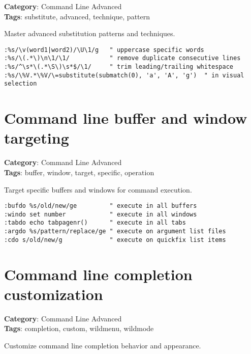 {{{\textbf{Category}: Command Line Advanced\\ \textbf{Tags}: substitute, advanced, technique, pattern
\vspace{0.5cm}

Master advanced substitution patterns and techniques.

\begin{Exa*}{}
\begin{Verbatim}[fontsize=\footnotesize, breaklines, breakanywhere]
:%s/\v(word1|word2)/\U\1/g   " uppercase specific words
:%s/\(.*\)\n\1/\1/           " remove duplicate consecutive lines
:%s/^\s*\(.*\S\)\s*$/\1/     " trim leading/trailing whitespace
:%s/\%V.*\%V/\=substitute(submatch(0), 'a', 'A', 'g')  " in visual selection
\end{Verbatim}
\end{Exa*}

\section{Command line buffer and window targeting}

\textbf{Category}: Command Line Advanced\\ \textbf{Tags}: buffer, window, target, specific, operation
\vspace{0.5cm}

Target specific buffers and windows for command execution.

\begin{Exa*}{}
\begin{Verbatim}[fontsize=\footnotesize, breaklines, breakanywhere]
:bufdo %s/old/new/ge         " execute in all buffers
:windo set number            " execute in all windows  
:tabdo echo tabpagenr()      " execute in all tabs
:argdo %s/pattern/replace/ge " execute on argument list files
:cdo s/old/new/g             " execute on quickfix list items
\end{Verbatim}
\end{Exa*}

\section{Command line completion customization}

\textbf{Category}: Command Line Advanced\\ \textbf{Tags}: completion, custom, wildmenu, wildmode
\vspace{0.5cm}

Customize command line completion behavior and appearance.

}}}
